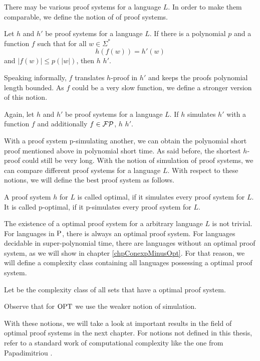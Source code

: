   There may be various proof systems for a language \(L\). In order to make them comparable, we define the notion of  of proof systems.
  
  \begin{definition}
    Let \(h\) and \(h'\) be proof systems for a language \(L\). If there is a polynomial \(p\) and a function \(f\) such that for all \(w \in \Sigma^*\)
      \[
        h(f(w)) = h'(w)
      \]
    and \(|f(w)| \leq p(|w|)\), then \(h\)  \(h'\).
  \end{definition}

  Speaking informally, \(f\) translates \(h\)-proof in \(h'\) and keeps the proofs polynomial length bounded. As \(f\) could be a very slow function, we define a stronger version of this notion.

  \begin{definition}
   Again, let \(h\) and \(h'\) be proof systems for a language \(L\). If \(h\) simulates \(h'\) with a function \(f\) and additionally \(f \in \FP\), \(h\)  \(h'\).
  \end{definition}

  With a proof system p-simulating another, we can obtain the polynomial short proof mentioned above in polynomial short time. As said before, the shortest \(h\)-proof could still be very long. With the notion of simulation of proof systems, we can compare different proof systems for a language \(L\). With respect to these notions, we will define the best proof system as follows.

  \begin{definition}
    A proof system \(h\) for \(L\) is called optimal, if it simulates every proof system for \(L\). It is called p-optimal, if it p-simulates every proof system for \(L\).
  \end{definition}

  The existence of a optimal proof system for a arbitrary language \(L\) is not trivial. For languages in \(\P\), there is always an optimal proof system. For languages decidable in super-polynomial time, there are languages without an optimal proof system, as we will show in chapter \ref{chpConexpMinusOpt}. For that reason, we will define a complexity class containing all languages possessing a optimal proof system.

  \begin{definition}
    Let  be the complexity class of all sets that have a optimal proof system.
  \end{definition}

  Observe that for \(\OPT\) we use the weaker notion of simulation.

  With these notions, we will take a look at important results in the field of optimal proof systems in the next chapter. For notions not defined in this thesis, refer to a standard work of computational complexity like the one from Papadimitriou \cite{Pap94}.

